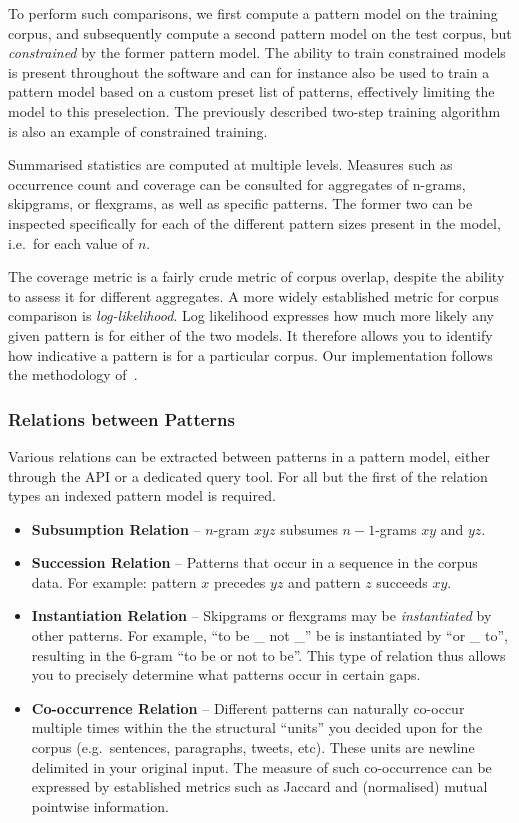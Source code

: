 \documentclass[a4paper,12pt]{article}
\begin{document}
To perform such comparisons, we first compute a pattern model on the training
corpus, and subsequently compute a second pattern model on the test corpus, but
\emph{constrained} by the former pattern model. The ability to train
constrained models is present throughout the software and can for instance also
be used to train a pattern model based on a custom preset list of patterns,
effectively limiting the model to this preselection. The previously described
two-step training algorithm is also an example of constrained training.

Summarised statistics are computed at multiple levels. Measures such as
occurrence count and coverage can be consulted for aggregates of n-grams,
skipgrams, or flexgrams, as well as specific patterns. The former two can be
inspected specifically for each of the different pattern sizes present in the
model, i.e.\ for each value of $n$.

The coverage metric is a fairly crude metric of corpus overlap, despite the
ability to assess it for different aggregates. A more widely established metric
for corpus comparison is \emph{log-likelihood}. Log likelihood expresses how much more
likely any given pattern is for either of the two models. It therefore allows
you to identify how indicative a pattern is for a particular corpus. Our
implementation follows the methodology of~\cite{Rayson00comparingcorpora}.

\subsubsection{Relations between Patterns}

Various relations can be extracted between patterns in a pattern model, either
through the API or a dedicated query tool. For all but the first of the
relation types an indexed pattern model is required. 

\begin{itemize}
 \item \textbf{Subsumption Relation} -- $n$-gram $x y z$ subsumes $n-1$-grams $x y$ and $y z$. 
 \item \textbf{Succession Relation} -- Patterns that occur in a sequence in the
     corpus data. For example: pattern $x$ precedes $yz$ and pattern $z$ succeeds $xy$.
 \item \textbf{Instantiation Relation} -- Skipgrams or flexgrams may be
     \emph{instantiated} by other patterns. For example, ``to be \_ not \_'' be
     is instantiated by ``or \_ to'', resulting in the 6-gram ``to be or not to be''. This type of relation thus allows you to precisely determine what patterns occur in certain gaps.
 \item \textbf{Co-occurrence Relation} -- Different patterns can naturally co-occur multiple times
     within the the structural ``units'' you decided upon for the corpus (e.g.\ 
     sentences, paragraphs, tweets, etc). These units are newline delimited in
     your original input. The measure of such co-occurrence 
     can be expressed by established metrics such as Jaccard and (normalised) mutual
     pointwise information.
\end{itemize}
\end{document}
